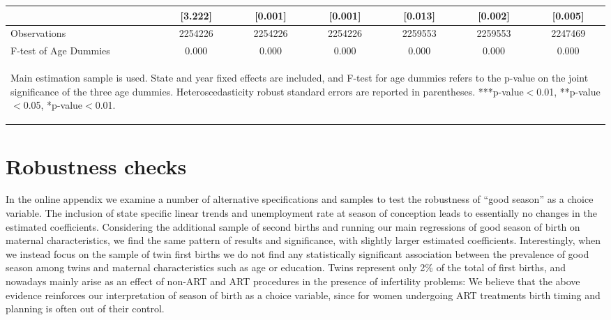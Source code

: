 \documentclass[a4paper, 12 pt]{article}
\theoremstyle{plain}
\begin{document}
\begin{doublespace}
\begin{table}[htbp]
\begin{tabular}{l*{6}{c}}
                    &     [3.222]   &     [0.001]   &     [0.001]   &     [0.013]   &     [0.002]   &     [0.005]   \\
\midrule
Observations        &     2254226   &     2254226   &     2254226   &     2259553   &     2259553   &     2247469   \\
F-test of Age Dummies&0.000&0.000&0.000&0.000&0.000&0.000 \\
\bottomrule
\multicolumn{7}{p{15cm}}{\begin{footnotesize}Main estimation
sample is used. State and year fixed effects are
included, and F-test for age dummies refers to the p-value on
the joint significance of the three age dummies.
Heteroscedasticity robust standard errors are reported in
parentheses.
***p-value$<$0.01, **p-value$<$0.05, *p-value$<$0.01.
\end{footnotesize}}\end{tabular}\end{table}



\newpage
\section{Robustness checks}
In the online appendix we examine a number of alternative specifications and samples to test the robustness of ``good season'' as a choice variable.  The inclusion of state specific linear trends and unemployment rate at season of conception leads to essentially no changes in the estimated coefficients. Considering the additional sample of second births and running our main regressions of good season of birth on maternal characteristics, we find the same pattern of results and significance, with slightly larger estimated coefficients. Interestingly, when we instead focus on the sample of twin first births we do not find any statistically significant association between the prevalence of good season among twins and maternal characteristics such as age or education. Twins represent only 2\% of the total of first births, and nowadays mainly arise as an effect of non-ART and ART procedures in the presence of infertility problems: We believe that the above evidence reinforces our interpretation of season of birth as a choice variable, since for women undergoing ART treatments birth timing and planning is often out of their control.




\newpage


\end{doublespace}
\end{document}
